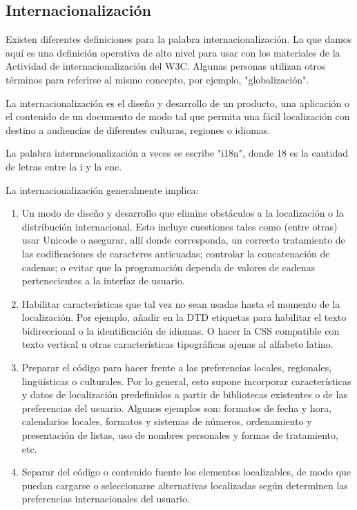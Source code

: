 \begin{enumerate}
\subsection{Internacionalización}

Existen diferentes definiciones para la palabra internacionalización. La que damos aquí es una definición operativa de alto nivel para usar con los materiales de la Actividad de internacionalización del W3C. Algunas personas utilizan otros términos para referirse al mismo concepto, por ejemplo, "globalización".

La internacionalización es el diseño y desarrollo de un producto, una aplicación o el contenido de un documento de modo tal que permita una fácil localización con destino a audiencias de diferentes culturas, regiones o idiomas.
\begin{remark}
	La palabra internacionalización a veces se escribe "i18n", donde 18 es la cantidad de letras entre la i y la ene.
\end{remark}

La internacionalización generalmente implica:

\begin{enumerate}
	\item Un modo de diseño y desarrollo que elimine obstáculos a la localización o la distribución internacional. Esto incluye cuestiones tales como (entre otras) usar Unicode o asegurar, allí donde corresponda, un correcto tratamiento de las codificaciones de caracteres anticuadas; controlar la concatenación de cadenas; o evitar que la programación dependa de valores de cadenas pertenecientes a la interfaz de usuario.
	\item Habilitar características que tal vez no sean usadas hasta el momento de la localización. Por ejemplo, añadir en la DTD etiquetas para habilitar el texto bidireccional o la identificación de idiomas. O hacer la CSS compatible con texto vertical u otras características tipográficas ajenas al alfabeto latino.
	\item Preparar el código para hacer frente a las preferencias locales, regionales, lingüísticas o culturales. Por lo general, esto supone incorporar características y datos de localización predefinidos a partir de bibliotecas existentes o de las preferencias del usuario. Algunos ejemplos son: formatos de fecha y hora, calendarios locales, formatos y sistemas de números, ordenamiento y presentación de listas, uso de nombres personales y formas de tratamiento, etc.
	\item Separar del código o contenido fuente los elementos localizables, de modo que puedan cargarse o seleccionarse alternativas localizadas según determinen las preferencias internacionales del usuario.
\end{enumerate}


\end{enumerate}
